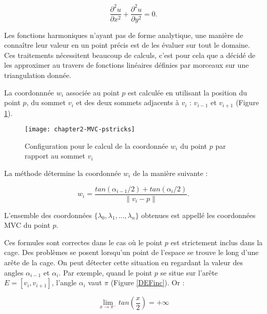 \begin{equation}
  \frac{\partial^2 u}{\partial x^2} + \frac{\partial^2 u}{\partial y^2} = 0.
\end{equation}

Les fonctions harmoniques n'ayant pas de forme analytique, une manière de
connaître leur valeur en un point précis est de les évaluer sur tout le
domaine. Ces traitements nécessitent beaucoup de calculs, c'est pour cela que
\cite{Flo03} a décidé de les approximer au travers de fonctions linéaires
définies par morceaux sur une triangulation donnée.

La coordonnnée $w_i$ associée au point $p$ est calculée en utilisant la
position du point $p$, du sommet $v_i$ et des deux sommets adjacents à $v_i$ :
$v_{i-1}$ et $v_{i+1}$ (Figure \ref{DEFcal}).

\begin{figure}[ht]
  \begin{center}
    \texttt{[image: chapter2-MVC-pstricks]}

    \caption[Configuration pour calcul MVC] {Configuration pour le calcul de
la coordonnée $w_i$ du point $p$ par rapport au sommet $v_i$}

    \label{DEFcal}   \end{center} \end{figure}

La méthode détermine la coordonnée $w_i$ de la manière suivante :

\begin{equation}
  w_i = \frac{tan(\alpha_{i-1}/2) + tan(\alpha_i/2)}{\| v_i - p \|}.
  \label{DEFcoo}
\end{equation}

L'ensemble des coordonnées $\{\lambda_0, \lambda_1, ..., \lambda_n\}$ obtenues
est appellé les coordonnées MVC du point $p$.

Ces formules sont correctes dans le cas où le point $p$ est strictement inclus
dans la cage. Des problèmes se posent lorsqu'un point de l'espace se trouve le
long d'une arête de la cage. On peut détecter cette situation en regardant la
valeur des angles $\alpha_{i-1}$ et $\alpha_i$. Par exemple, quand le point
$p$ se situe sur l'arête $E = [v_i,v_{i+1}]$, l'angle $\alpha_i$ vaut $\pi$
(Figure \ref{DEFinc}). Or :

\begin{displaymath}
  \lim\limits_{x \to \pi^-} tan(\frac{x}{2}) = +\infty
\end{displaymath}

